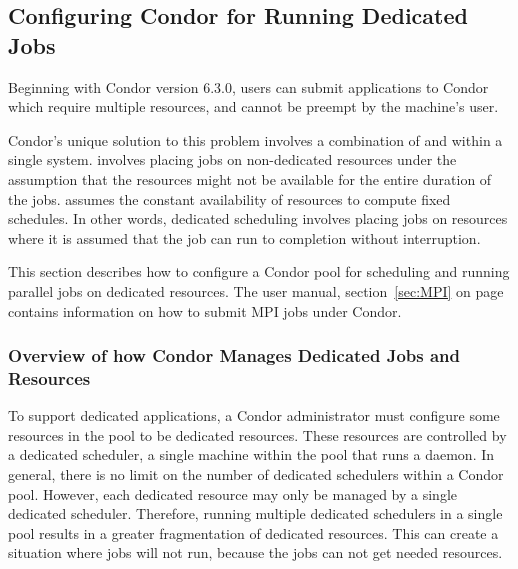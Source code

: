 \subsection{\label{sec:Config-Dedicated-Jobs}
Configuring Condor for Running Dedicated Jobs} 


Beginning with Condor version 6.3.0, users can submit applications to
Condor which require multiple resources, and cannot be preempt by
the machine's user.

Condor's unique solution to this problem involves a combination of
 and  within
a single system.
 involves placing jobs on non-dedicated
resources under the assumption that the resources might not be
available for the entire duration of the jobs.
 assumes the constant availability of
resources to compute fixed schedules.
In other words, dedicated scheduling involves placing jobs on
resources where it is assumed that the job can run to completion
without interruption.

This section describes how to configure a Condor pool for scheduling
and running parallel jobs on dedicated resources.
The user manual, section~\ref{sec:MPI} on page~\pageref{sec:MPI}
contains information on how to submit MPI jobs under Condor.


\subsubsection{\label{sec:Overview-Dedicated-Condor}
Overview of how Condor Manages Dedicated Jobs and Resources}

To support dedicated applications, a Condor administrator must
configure some resources in the pool to be dedicated resources.
These resources are controlled by a dedicated scheduler, a
single machine within the pool that runs a  daemon.
In general, there is no limit on the number of dedicated schedulers within
a Condor pool.
However, each dedicated resource may only be managed by a single
dedicated scheduler.
Therefore, running multiple dedicated schedulers in a single pool
results in a greater fragmentation of dedicated resources.
This can create a situation where jobs will not run, because the jobs
can not get needed resources.  

